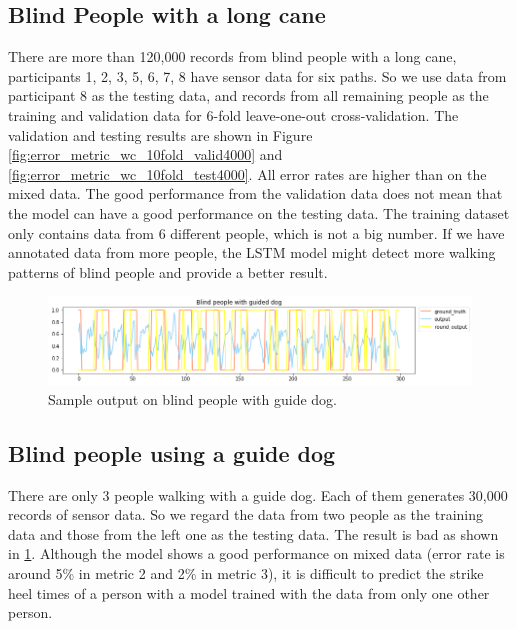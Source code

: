 \documentclass[11pt]{article}
\begin{document}
{\subsection{Blind People with a long cane}
There are more than 120,000 records from blind people with a long cane, participants 1, 2, 3, 5, 6, 7, 8 have sensor data for six paths. So we use data from participant 8 as the testing data, and records from all remaining people as the training and validation data for 6-fold leave-one-out cross-validation. The validation and testing results are shown in Figure \ref{fig:error_metric_wc_10fold_valid4000} and \ref{fig:error_metric_wc_10fold_test4000}. All error rates are higher than on the mixed data. The good performance from the validation data does not mean that the model can have a good performance on the testing data.
The training dataset only contains data from 6 different people, which is not a big number. If we have annotated data from more people, the LSTM model might detect more walking patterns of blind people and provide a better result.

\begin{figure}[ht]
\centering
\includegraphics[scale=0.5]{blind_gd}
\caption{Sample output on blind people with guide dog.}
\label{fig:blind_gd}
\end{figure}


\subsection{Blind people using a guide dog}

There are only 3 people walking with a guide dog. Each of them generates 30,000 records of sensor data. So we regard the data from two people as the training data and those from the left one as the testing data. The result is bad as shown in \ref{fig:blind_gd}. Although the model shows a  good performance on mixed data (error rate is around 5\% in metric 2 and 2\% in metric 3), it is difficult to predict the strike heel times of a person with a model trained with the data from only one other person.

}
\end{document}
